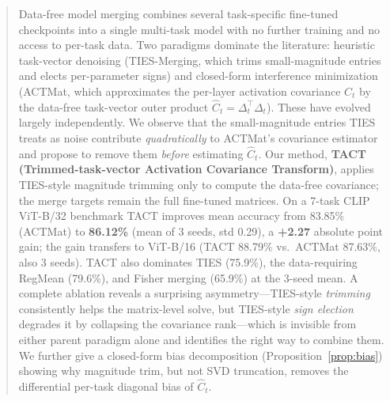 \documentclass{article}
\theoremstyle{plain}
\theoremstyle{definition}
\theoremstyle{remark}
\begin{document}

\printAffiliationsAndNotice{}

\begin{abstract}
Data-free model merging combines several task-specific fine-tuned checkpoints into a single multi-task model with no further training and no access to per-task data. Two paradigms dominate the literature: heuristic task-vector denoising (TIES-Merging, which trims small-magnitude entries and elects per-parameter signs) and closed-form interference minimization (ACTMat, which approximates the per-layer activation covariance $C_t$ by the data-free task-vector outer product $\hat{C}_t = \Delta_t^\top \Delta_t$). These have evolved largely independently. We observe that the small-magnitude entries TIES treats as noise contribute \emph{quadratically} to ACTMat's covariance estimator and propose to remove them \emph{before} estimating $\hat C_t$. Our method, \textbf{TACT (Trimmed-task-vector Activation Covariance Transform)}, applies TIES-style magnitude trimming only to compute the data-free covariance; the merge targets remain the full fine-tuned matrices. On a 7-task CLIP ViT-B/32 benchmark TACT improves mean accuracy from 83.85\% (ACTMat) to \textbf{86.12\%} (mean of 3 seeds, std 0.29), a \textbf{+2.27} absolute point gain; the gain transfers to ViT-B/16 (TACT 88.79\% vs.\ ACTMat 87.63\%, also 3 seeds). TACT also dominates TIES (75.9\%), the data-requiring RegMean (79.6\%), and Fisher merging (65.9\%) at the 3-seed mean. A complete ablation reveals a surprising asymmetry---TIES-style \emph{trimming} consistently helps the matrix-level solve, but TIES-style \emph{sign election} degrades it by collapsing the covariance rank---which is invisible from either parent paradigm alone and identifies the right way to combine them. We further give a closed-form bias decomposition (Proposition~\ref{prop:bias}) showing why magnitude trim, but not SVD truncation, removes the differential per-task diagonal bias of $\hat C_t$.
\end{abstract}
\end{document}
